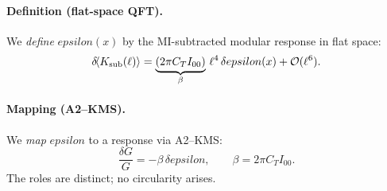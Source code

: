 \documentclass[aps,prd,onecolumn,superscriptaddress,nofootinbib]{revtex4-2}
\def\eps{epsilon}%
\providecommand{\eps}{\varepsilon}
\begin{document}
\paragraph{Definition (flat-space QFT).} We \emph{define} \(\eps(x)\) by the MI-subtracted modular response in flat space:
\begin{equation}
\label{eq:eps-def}
\delta\!\langle K_{\rm sub}(\ell)\rangle = \underbrace{(2\pi C_T I_{00})}_{\beta}\,\ell^4\,\delta\eps(x) + \mathcal O(\ell^6).
\end{equation}
\paragraph{Mapping (A2--KMS).} We \emph{map} \(\eps\) to a response via A2--KMS:
\begin{equation}
\label{eq:mapping}
\frac{\delta G}{G}=-\beta\,\delta\eps,\qquad \beta=2\pi C_T I_{00}.
\end{equation}
The roles are distinct; no circularity arises.
\end{document}
